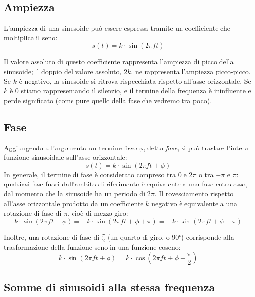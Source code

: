 \subsection{Ampiezza}

L'ampiezza di una sinusoide può essere espressa tramite un coefficiente che moltiplica il seno:
\begin{equation}
s(t) = k \cdot \sin(2 \pi f t)
\end{equation}

Il valore assoluto di questo coefficiente rappresenta l'ampiezza di picco della sinusoide; il doppio del valore assoluto, $2k$, ne rappresenta l'ampiezza picco-picco. Se $k$ è negativo, la sinusoide si ritrova rispecchiata rispetto all'asse orizzontale. Se $k$ è 0 stiamo rappresentando il silenzio, e il termine della frequenza è ininfluente e perde significato (come pure quello della fase che vedremo tra poco).


\subsection{Fase}

Aggiungendo all'argomento un termine fisso $\phi$, detto \emph{fase}, si può traslare l'intera funzione sinusoidale sull'asse orizzontale:
\begin{equation}
s(t) = k \cdot \sin(2 \pi f t + \phi)
\end{equation}
In generale, il termine di fase è considerato compreso tra 0 e $2 \pi$ o tra $-\pi$ e $\pi$: qualsiasi fase fuori dall'ambito di riferimento è equivalente a una fase entro esso, dal momento che la sinusoide ha un periodo di $2 \pi$. Il rovesciamento rispetto all'asse orizzontale prodotto da un coefficiente $k$ negativo è equivalente a una rotazione di fase di $\pi$, cioè di mezzo giro:
\begin{equation}
k \cdot \sin(2 \pi f t + \phi) = -k \cdot \sin(2 \pi f t + \phi + \pi) = -k \cdot \sin(2 \pi f t + \phi - \pi)
\end{equation}

Inoltre, una rotazione di fase di $\frac{\pi}{2}$ (un quarto di giro, o 90°) corrisponde alla trasformazione della funzione seno in una funzione coseno:
\begin{equation}
k \cdot \sin(2 \pi f t + \phi) = k \cdot \cos(2 \pi f t + \phi - \frac{\pi}{2})
\end{equation}


\subsection{Somme di sinusoidi alla stessa frequenza}


